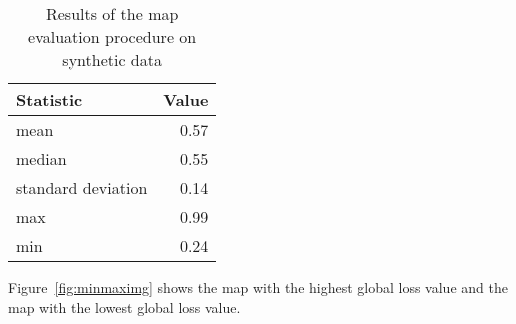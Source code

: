 \begin{table}[h]
  \centering
  \begin{tabular}{lr}
    \toprule
    Statistic & Value\\
    \midrule
    mean & 0.57\\
    median & 0.55\\
    standard deviation & 0.14\\
    max & 0.99\\
    min & 0.24\\    
    \bottomrule
  \end{tabular}
  \caption[Map evaluation procedure on synthetic data]{Results of the map evaluation procedure on synthetic data}
  \label{tab:mapeval}

\end{table}

Figure~\ref{fig:minmaximg} shows the map with the highest global loss value and the map with the lowest global loss value.